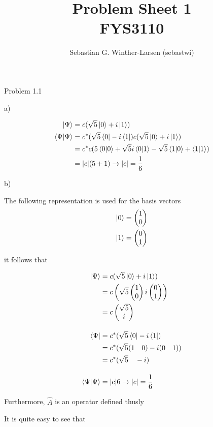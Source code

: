 \documentclass{article}
\title{Problem Sheet 1 \\
\large{FYS3110}}
\author{Sebastian G. Winther-Larsen (sebastwi)}
\begin{document}
\maketitle

Problem 1.1

\hspace{1cm}

a)

\begin{align*}
\ket{\Psi} 		&= c(\sqrt{5}\ket{0}+i\ket{1})\\
\braket{\Psi} 	&= c^*(\sqrt{5}\bra{0}-i\bra{1}) c(\sqrt{5}\ket{0}+i\ket{1})\\
				&= c^*c(5\braket{0}+\sqrt{5}i\braket{0}{1}-\sqrt{5}\braket{1}{0}+\braket{1})\\
				&= \abs{c}(5+1) \rightarrow \abs{c}=\frac{1}{6}
\end{align*}

\hspace{1cm}

b)

The following representation is used for the basis vectors
\begin{align*}
\ket{0} &= \begin{pmatrix} 1 \\ 0 \end{pmatrix}\\
\ket{1} &= \begin{pmatrix} 0 \\ 1 \end{pmatrix}
\end{align*}

it follows that

\begin{align*}
\ket{\Psi} 	&= c(\sqrt{5}\ket{0}+i\ket{1}) \\
			&= c\left(
				\sqrt{5} \begin{pmatrix} 1 \\ 0 \end{pmatrix}
				i \begin{pmatrix} 0 \\ 1 \end{pmatrix}
				\right) \\
			&= c \begin{pmatrix} \sqrt{5} \\ i \end{pmatrix} \\[10pt]
\bra{\Psi} 	&= c^*(\sqrt{5}\bra{0}-i\bra{1}) \\
			&= c^*( \sqrt{5} ( 1 \quad 0 ) -i ( 0 \quad 1 )) \\
			&= c^* ( \sqrt{5} \quad  -i ) \\[10pt]
\braket{\Psi} &= \abs{c}6 \rightarrow \abs{c}=\frac{1}{6}
\end{align*}

Furthermore, $\hat{A}$ is an operator defined thusly


It is quite easy to see that 
\begin{equation*}

\end{equation*}
\end{document}
